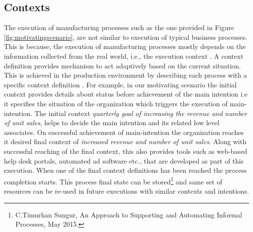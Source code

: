 \subsection{Contexts} 
\label{sec:contexts}
The execution of manufacturing processes such as the one provided in Figure \ref{fig:motivatingscenario}, are not similar to execution of typical business processes. This is because, the execution of manufacturing processes mostly depends on the information collected from the real world, i.e., the execution context \cite{Sungur2016}. A context definition provides mechanism to act adaptively based on the current situation. This is achieved in the production environment by describing each process with a specific context definition \cite{Sungur2016}. For example, in our motivating scenario the initial context provides details about status before achievement of the main intention i.e it specifies the situation of the organization which triggers the execution of main-intention. The initial context \textit{quarterly goal of increasing the revenue and number of unit sales}, helps to decide the main intention and its related low level associates. On successful achievement of main-intention the organization reaches it desired final context of \textit{increased revenue and number of unit sales}. Along with successful reaching of the final context, this also provides tools such as web-based help desk portals, automated ad software etc., that are developed as part of this execution. When one of the final context definitions has been reached the process completion starts. This process final state can be stored\footnote{C.Timurhan Sungur, An Approach to Supporting and Automating Informal Processes, May 2015.} and same set of resources can be re-used in future executions with similar contexts and intentions.
 
